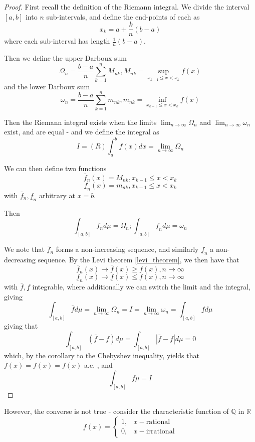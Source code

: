 \documentclass[11pt,a4paper]{report}
\theoremstyle{plain}
\theoremstyle{definition}
\theoremstyle{remark}
\newcommand{\R}{\mathbb{R}}
\newcommand{\Q}{\mathbb{Q}}
\newcommand{\abs}[1]{\left| #1 \right|}
\begin{document}
\begin{proof}
    First recall the definition of the Riemann integral. We divide the interval $[a, b]$ into $n$ sub-intervals, and define the end-points of each as
    $$ x_k = a + \frac{k}{n}(b - a) $$
    where each sub-interval has length $\frac{1}{n}(b -a)$.

    Then we define the upper Darboux sum
    $$\Omega_n = \frac{b-a}{n} \sum_{k=1}^n M_{nk}, M_{nk} = \sup_{x_{k-1} \le x < x_k} f(x) $$
    and the lower Darboux sum
    $$\omega_n = \frac{b-a}{n} \sum_{k=1}^n m_{nk}, m_{nk} = \inf_{x_{k-1} \le x < x_k} f(x) $$

    Then the Riemann integral exists when the limits $\lim_{n \rightarrow \infty} \Omega_n$ and $\lim_{n \rightarrow \infty} \omega_n$ exist, and are equal - and we define the integral as
    $$ I = (R) \int_a^b f(x) dx = \lim_{n \rightarrow \infty} \Omega_n $$

    \newcommand{\highF}{\bar{f}}
    \newcommand{\lowF}{\underline{f}}

    We can then define two functions
    $$ \highF_n(x) = M_{nk}, x_{k-1} \le x < x_k $$
    $$ \lowF_n(x) = m_{nk}, x_{k-1} \le x < x_k $$
    with $\highF_n, \lowF_n$ arbitrary at $x = b$.

    Then
    $$ \int_{[a, b]} \highF_n d\mu = \Omega_n; \int_{[a, b]} \lowF_n d\mu = \omega_n $$

    We note that $\highF_n$ forms a non-increasing sequence, and similarly $\lowF_n$ a non-decreasing sequence. By the Levi theorem \ref{levi_theorem}, we then have that
    $$ \highF_n(x) \rightarrow \highF(x) \ge f(x), n \rightarrow \infty $$
    $$ \lowF_n(x) \rightarrow \lowF(x) \le f(x), n \rightarrow \infty $$
    with $\highF, \lowF$ integrable, where additionally we can switch the limit and the integral, giving
    $$ \int_{[a, b]} \highF d\mu = \lim_{n \rightarrow \infty} \Omega_n = I = \lim_{n \rightarrow \infty} \omega_n = \int_{[a, b]} \lowF d \mu $$
    giving that 
    $$ \int_{[a, b]} (\highF - \lowF) d\mu = \int_{[a, b]} \abs{\highF - \lowF} d\mu = 0 $$
    which, by the corollary to the Chebyshev inequality, yields that $\highF(x) = f(x) = \lowF(x)$ a.e. , and
    $$ \int_{[a, b]} f \mu = I $$
\end{proof}

However, the converse is not true - consider the characteristic function of $\Q$ in $\R$
$$ f(x) = \begin{cases}
    1, &x - \text{rational} \\
    0, &x - \text{irrational} 
\end{cases}$$
\end{document}
